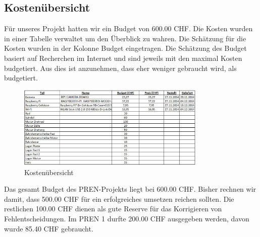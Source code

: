 

\subsection{Kostenübersicht}
Für unseres Projekt hatten wir ein Budget von 600.00 CHF. Die Kosten
wurden in einer Tabelle verwaltet um den Überblick zu wahren. Die
Schätzung für die Kosten wurden in der Kolonne Budget eingetragen. Die
Schätzung des Budget basiert auf Recherchen im Internet und sind jeweils
mit den maximal Kosten budgetiert. Aus dies ist anzunehmen, dass eher
weniger gebraucht wird, als budgetiert.

\begin{figure}[h!]
	\center
	\includegraphics[width=0.8\textwidth]{../../fig/Kostenuebersicht.jpg}
	\caption{Kostenübersicht}
	\label{fig:Kostenuebersicht}
\end{figure}

Das gesamt Budget des PREN-Projekts liegt bei 600.00 CHF. Bisher rechnen
wir damit, dass 500.00 CHF für ein erfolgreiches umsetzen reichen sollten.
Die restlichen 100.00 CHF dienen als gute Reserve für das Korrigieren von
Fehlentscheidungen. Im PREN 1 durfte 200.00 CHF ausgegeben werden, davon
wurde 85.40 CHF gebraucht. 








